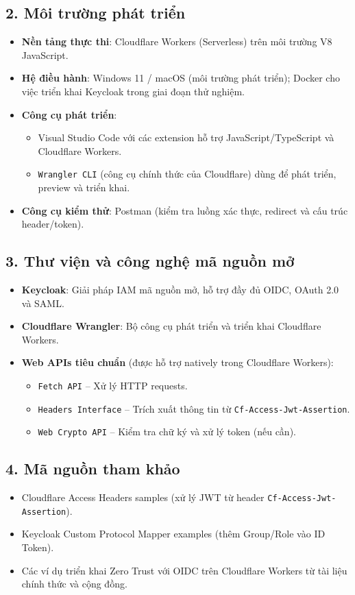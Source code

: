 \subsection*{2. Môi trường phát triển}

\begin{itemize}
\item \textbf{Nền tảng thực thi}: Cloudflare Workers (Serverless) trên môi trường V8 JavaScript.
\item \textbf{Hệ điều hành}: Windows 11 / macOS (môi trường phát triển); Docker cho việc triển khai Keycloak trong giai đoạn thử nghiệm.
\item \textbf{Công cụ phát triển}:
  \begin{itemize}
  \item Visual Studio Code với các extension hỗ trợ JavaScript/TypeScript và Cloudflare Workers.
  \item \texttt{Wrangler CLI} (công cụ chính thức của Cloudflare) dùng để phát triển, preview và triển khai.
  \end{itemize}
\item \textbf{Công cụ kiểm thử}: Postman (kiểm tra luồng xác thực, redirect và cấu trúc header/token).
\end{itemize}

\subsection*{3. Thư viện và công nghệ mã nguồn mở}

\begin{itemize}
\item \textbf{Keycloak}: Giải pháp IAM mã nguồn mở, hỗ trợ đầy đủ OIDC, OAuth 2.0 và SAML.
\item \textbf{Cloudflare Wrangler}: Bộ công cụ phát triển và triển khai Cloudflare Workers.
\item \textbf{Web APIs tiêu chuẩn} (được hỗ trợ natively trong Cloudflare Workers):
  \begin{itemize}
  \item \texttt{Fetch API} -- Xử lý HTTP requests.
  \item \texttt{Headers Interface} -- Trích xuất thông tin từ \texttt{Cf-Access-Jwt-Assertion}.
  \item \texttt{Web Crypto API} -- Kiểm tra chữ ký và xử lý token (nếu cần).
  \end{itemize}
\end{itemize}

\subsection*{4. Mã nguồn tham khảo}

\begin{itemize}
\item Cloudflare Access Headers samples (xử lý JWT từ header \texttt{Cf-Access-Jwt-Assertion}).
\item Keycloak Custom Protocol Mapper examples (thêm Group/Role vào ID Token).
\item Các ví dụ triển khai Zero Trust với OIDC trên Cloudflare Workers từ tài liệu chính thức và cộng đồng.
\end{itemize}